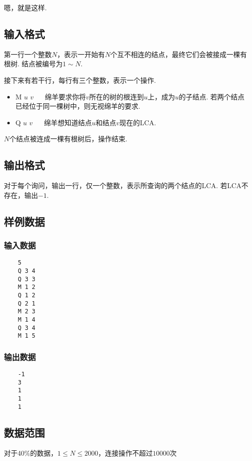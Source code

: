 \documentclass{article}
\begin{document}
\begin{CJK*}{UTF8}{gbsn}
    嗯，就是这样.

    \subsection*{输入格式}
    第一行一个整数$N$，表示一开始有$N$个互不相连的结点，最终它们会被接成一棵有根树. 结点被编号为$1 \sim N$.

    接下来有若干行，每行有三个整数，表示一个操作.

    \begin{itemize}
        \item M $u$ $v$   $\quad$   绵羊要求你将$v$所在的树的根连到$u$上，成为$u$的子结点. 若两个结点已经位于同一棵树中，则无视绵羊的要求.
        \item Q $u$ $v$   $\quad$   绵羊想知道结点$u$和结点$v$现在的LCA.
    \end{itemize}

    $N$个结点被连成一棵有根树后，操作结束.

    \subsection*{输出格式}
    对于每个询问，输出一行，仅一个整数，表示所查询的两个结点的LCA. 若LCA不存在，输出$-1$.

    \subsection*{样例数据}
    \begin{multicols}{2}
    \subsubsection*{输入数据}
    \begin{verbatim}
    5
    Q 3 4
    Q 3 3
    M 1 2
    Q 1 2
    Q 2 1
    M 2 3
    M 1 4
    Q 3 4
    M 1 5
    \end{verbatim}

    \columnbreak

    \subsubsection*{输出数据}
    \begin{verbatim}
    -1
    3
    1
    1
    1
    \end{verbatim}
    \end{multicols}

    \subsection*{数据范围}
    对于\phantom{0}40\%的数据，$1 \leq N \leq 2000$，连接操作不超过$10000$次


\end{CJK*}
\end{document}
